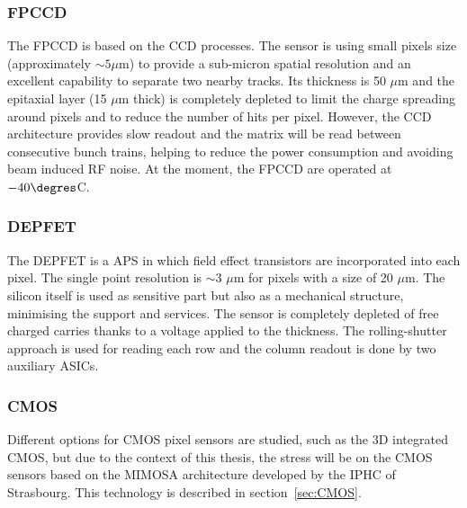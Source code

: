   \subsubsection{FPCCD}
   
     The \gls{FPCCD} \cite{CalanchaParedes} is based on the \gls{CCD} processes.
     The sensor is using small pixels size (approximately $\sim 5 \mu\text{m}$) to provide a sub-micron spatial resolution and an excellent capability to separate two nearby tracks.
     Its thickness is 50 $\mu\text{m}$ and the epitaxial layer (15 $\mu\text{m}$ thick) is completely depleted to limit the charge spreading around pixels and to reduce the number of hits per pixel.
     However, the \gls{CCD} architecture provides slow readout and the matrix will be read between consecutive bunch trains, helping to reduce the power consumption and avoiding beam induced RF noise.
     At the moment, the \gls{FPCCD} are operated at $-40 \degres$C.

   \subsubsection{DEPFET}
    
    The \gls{DEPFET}  is a \gls{APS} in which field effect transistors are incorporated into each pixel.
    The single point resolution is $\sim 3$ $\mu\text{m}$ for pixels with a size of 20 $\mu\text{m}$.
    The silicon itself is used as sensitive part but also as a mechanical structure, minimising the support and services.
    The sensor is completely depleted of free charged carries thanks to a voltage applied to the thickness.
    The rolling-shutter approach is used for reading each row and the column readout is done by two auxiliary \glspl{ASIC}.


   \subsubsection{CMOS}

   Different options for \gls{CMOS} pixel sensors are studied, such as the 3D integrated \gls{CMOS}, but due to the context of this thesis, the stress will be on the \gls{CMOS} sensors based on the \gls{MIMOSA} architecture developed by the IPHC of Strasbourg. 
   This technology is described in section~\ref{sec:CMOS}.


